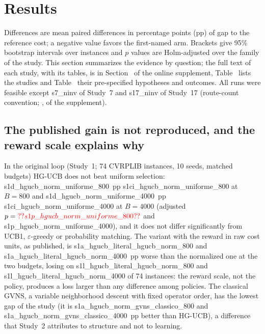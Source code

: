\section{Results}\label{sec:results}
Differences are mean paired differences in percentage points (pp) of gap to the reference cost; a negative value favors the first-named arm. Brackets give 95\% bootstrap intervals over instances and $p$ values are Holm-adjusted over the family of the study. This section summarizes the evidence by question; the full text of each study, with its tables, is in Section~ of the online supplement, Table~ lists the studies and Table~ their pre-specified hypotheses and outcomes. All runs were feasible except \num{s7_ninv} of Study~7 and \num{s17_ninv} of Study~17 (route-count convention; ,  of the supplement).

\subsection{The published gain is not reproduced, and the reward scale explains why}\label{sec:r1}
In the original loop (Study~1; 74 CVRPLIB instances, 10 seeds, matched budgets) HG-UCB does not beat uniform selection: \num{s1d_hgucb_norm_uniforme_800}~pp \num{s1ci_hgucb_norm_uniforme_800} at $B=800$ and \num{s1d_hgucb_norm_uniforme_4000}~pp \num{s1ci_hgucb_norm_uniforme_4000} at $B=4000$ (adjusted $p=\num{s1p_hgucb_norm_uniforme_800}$ and \num{s1p_hgucb_norm_uniforme_4000}), and it does not differ significantly from UCB1, $\varepsilon$-greedy or probability matching. The variant with the reward in raw cost units, as published, is \num{s1a_hgucb_literal_hgucb_norm_800} and \num{s1a_hgucb_literal_hgucb_norm_4000}~pp worse than the normalized one at the two budgets, losing on \num{s1l_hgucb_literal_hgucb_norm_800} and \num{s1l_hgucb_literal_hgucb_norm_4000} of 74 instances: the reward scale, not the policy, produces a loss larger than any difference among policies. The classical GVNS, a variable neighborhood descent with fixed operator order, has the lowest gap of the study (it is \num{s1a_hgucb_norm_gvns_classico_800} and \num{s1a_hgucb_norm_gvns_classico_4000}~pp better than HG-UCB), a difference that Study~2 attributes to structure and not to learning.

